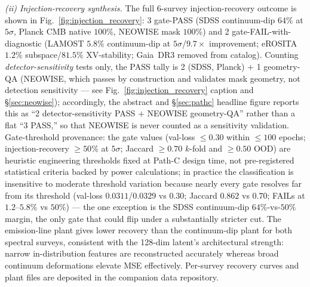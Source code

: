 \documentclass[aps,prd,twocolumn,superscriptaddress,showpacs,preprintnumbers,nofootinbib,longbibliography,floatfix]{revtex4-2}
\begin{document}
\textit{(ii) Injection-recovery synthesis.} The full 6-survey injection-recovery outcome is shown in Fig.~\ref{fig:injection_recovery}: 3 gate-PASS (SDSS continuum-dip $64\%$ at $5\sigma$, Planck CMB native $100\%$, NEOWISE mask $100\%$) and 2 gate-FAIL-with-diagnostic (LAMOST $5.8\%$ continuum-dip at $5\sigma$/$9.7\times$ improvement; eROSITA $1.2\%$ subspace/$81.5\%$ XV-stability; Gaia~DR3 removed from catalog). Counting \emph{detector-sensitivity} tests only, the PASS tally is 2 (SDSS, Planck) $+$ 1 geometry-QA (NEOWISE, which passes by construction and validates mask geometry, not detection sensitivity --- see Fig.~\ref{fig:injection_recovery} caption and \S\ref{sec:neowise}); accordingly, the abstract and \S\ref{sec:pathc} headline figure reports this as ``2 detector-sensitivity PASS $+$ NEOWISE geometry-QA'' rather than a flat ``3 PASS,'' so that NEOWISE is never counted as a sensitivity validation. Gate-threshold provenance: the gate values (val-loss $\leq 0.30$ within $\leq\!100$ epochs; injection-recovery $\geq\!50\%$ at $5\sigma$; Jaccard $\geq\!0.70$ $k$-fold and $\geq\!0.50$ OOD) are heuristic engineering thresholds fixed at Path-C design time, not pre-registered statistical criteria backed by power calculations; in practice the classification is insensitive to moderate threshold variation because nearly every gate resolves far from its threshold (val-loss $0.0311$/$0.0329$ vs $0.30$; Jaccard $0.862$ vs $0.70$; FAILs at $1.2$--$5.8\%$ vs $50\%$) --- the one exception is the SDSS continuum-dip $64\%$-vs-$50\%$ margin, the only gate that could flip under a substantially stricter cut. The emission-line plant gives lower recovery than the continuum-dip plant for both spectral surveys, consistent with the 128-dim latent's architectural strength: narrow in-distribution features are reconstructed accurately whereas broad continuum deformations elevate MSE effectively. Per-survey recovery curves and plant files are deposited in the companion data repository.
\end{document}
